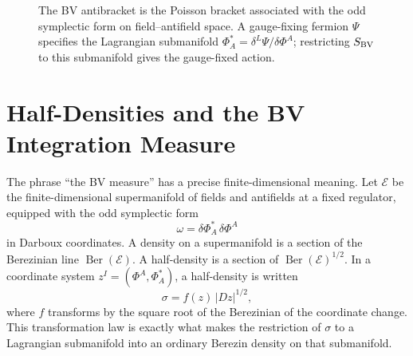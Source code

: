 \begin{figure}[H]
{
  }
  \caption{The BV antibracket is the Poisson bracket associated with the odd
  symplectic form on field--antifield space.  A gauge-fixing fermion
  \(\Psi\) specifies the Lagrangian submanifold
  \(\Phi_A^*=\delta^L\Psi/\delta\Phi^A\); restricting \(S_{\rm BV}\) to this
  submanifold gives the gauge-fixed action.}
  \label{fig:bv-field-antifield-master-map}
\end{figure}

\section{Half-Densities and the BV Integration Measure}
\label{sec:bv-half-densities-measure}

The phrase ``the BV measure'' has a precise finite-dimensional meaning.  Let
\(\mathcal E\) be the finite-dimensional supermanifold of fields and
antifields at a fixed regulator, equipped with the odd symplectic form
\[
  \omega
  =
  \delta\Phi^*_A\,\delta\Phi^A
\]
in Darboux coordinates.  A density on a supermanifold is a section of the
Berezinian line \(\operatorname{Ber}(\mathcal E)\).  A half-density is a
section of \(\operatorname{Ber}(\mathcal E)^{1/2}\).  In a coordinate system
\(z^I=(\Phi^A,\Phi^*_A)\), a half-density is written
\[
  \sigma=f(z)\,|Dz|^{1/2},
\]
where \(f\) transforms by the square root of the Berezinian of the coordinate
change.  This transformation law is exactly what makes the restriction of
\(\sigma\) to a Lagrangian submanifold into an ordinary Berezin density on
that submanifold.

